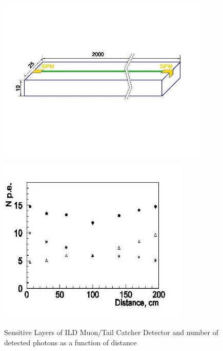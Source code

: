 \begin{figure}
	\centering
\includegraphics[height=8cm]{MuonDetector/MuonDetectorILD/Sc_strip.jpg}
\includegraphics[height=8cm]{MuonDetector/MuonDetectorILD/Sc_strip_photons.jpg}
	\caption{Sensitive Layers of ILD Muon/Tail Catcher Detector and number of detected photons as a function of distance}
	\label{fig:ild:muon:concept}
\end{figure}

